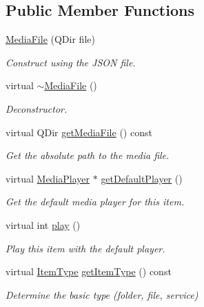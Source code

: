 \subsection*{Public Member Functions}
\begin{DoxyCompactItemize}
\item 
\hyperlink{class_a_w_e_1_1_media_file_af107afc7258da6cbadce1330bb9697a5}{Media\-File} (Q\-Dir file)
\begin{DoxyCompactList}\small\item\em Construct using the J\-S\-O\-N file. \end{DoxyCompactList}\item 
\hypertarget{class_a_w_e_1_1_media_file_a0ce25306ecf5a24c21dc3540d6293566}{virtual \hyperlink{class_a_w_e_1_1_media_file_a0ce25306ecf5a24c21dc3540d6293566}{$\sim$\-Media\-File} ()}\label{class_a_w_e_1_1_media_file_a0ce25306ecf5a24c21dc3540d6293566}

\begin{DoxyCompactList}\small\item\em Deconstructor. \end{DoxyCompactList}\item 
virtual Q\-Dir \hyperlink{class_a_w_e_1_1_media_file_a998b1415a248cf1915c7ff2b48af8586}{get\-Media\-File} () const 
\begin{DoxyCompactList}\small\item\em Get the absolute path to the media file. \end{DoxyCompactList}\item 
virtual \hyperlink{class_a_w_e_1_1_media_player}{Media\-Player} $\ast$ \hyperlink{class_a_w_e_1_1_media_file_a721cb652605a6cbc17a42899d9909079}{get\-Default\-Player} ()
\begin{DoxyCompactList}\small\item\em Get the default media player for this item. \end{DoxyCompactList}\item 
virtual int \hyperlink{class_a_w_e_1_1_media_file_a04870b77386642ea6568918f8d2693a2}{play} ()
\begin{DoxyCompactList}\small\item\em Play this item with the default player. \end{DoxyCompactList}\item 
virtual \hyperlink{namespace_a_w_e_ad175a5b8a86bf7848825c9bd94c41470}{Item\-Type} \hyperlink{class_a_w_e_1_1_media_file_a135ea553d8a72ec3c87b75281768ca69}{get\-Item\-Type} () const 
\begin{DoxyCompactList}\small\item\em Determine the basic type (folder, file, service) \end{DoxyCompactList}\end{DoxyCompactItemize}
